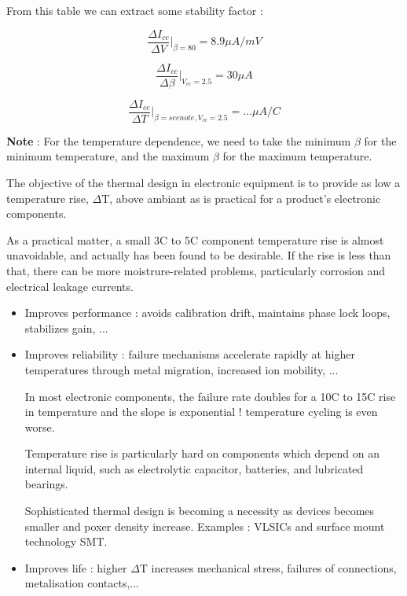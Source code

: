 From this table we can extract some stability factor :

\begin{equation}
\frac{\Delta I_{cc}}{\Delta V}\vert _{\beta = 80} = 8.9 \mu A / mV
\end{equation}

\begin{equation}
\frac{\Delta I_{cc}}{\Delta \beta}\vert _{V_{cc} = 2.5} = 30 \mu A
\end{equation}

\begin{equation}
\frac{\Delta I_{cc}}{\Delta T}\vert _{\beta = see note, V_{cc} = 2.5 } = \ldots \mu A / C
\end{equation}

\textbf{Note} : For the temperature dependence, we need to take the minimum $\beta$ for the minimum temperature, and the maximum $\beta$ for the maximum temperature.






The objective of the thermal design in electronic equipment is to
provide as low a temperature rise, $\Delta$T, above ambiant as is
practical for a product's electronic components.

As a practical matter, a small 3C to 5C component
temperature rise is almost unavoidable, and actually has been found
to be desirable. If the rise is less than that, there can be more
moistrure-related problems, particularly corrosion and electrical
leakage currents.

\begin{itemize}
	\item Improves performance : avoids calibration drift, maintains
	phase lock loops, stabilizes gain, ...

	\item Improves reliability : failure mechanisms accelerate
	rapidly at higher temperatures through metal migration, increased
	ion mobility, ...

	In most electronic components, the failure rate doubles for a
	10C to 15C rise in temperature and the slope is
	exponential ! temperature cycling is even worse.

	Temperature rise is particularly hard on components which depend
	on an internal liquid, such as electrolytic capacitor,
	batteries, and lubricated bearings.

	Sophisticated thermal design is becoming a necessity as devices
	becomes smaller and poxer density increase. Examples : VLSICs and
	surface mount technology SMT.

	\item Improves life : higher $\Delta$T increases mechanical
	stress, failures of connections, metalisation contacts,...
\end{itemize}

